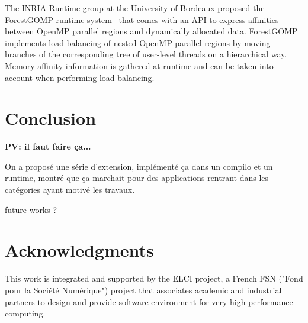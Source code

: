 \documentclass{Styles/llncs}
\newcommand{\PV}[1]{{\color{purple}\bfseries PV: #1}}
\begin{document}
The INRIA Runtime group at the University of Bordeaux proposed the
ForestGOMP runtime system~\cite{BroFurGogWacNam10IJPP} that comes
with an API to express affinities between OpenMP parallel regions and
dynamically allocated data. ForestGOMP implements load balancing of
nested OpenMP parallel regions by moving branches of the corresponding
tree of user-level threads on a hierarchical way. Memory affinity
information is gathered at runtime and can be taken into account when
performing load balancing.

\section{Conclusion}

\PV{il faut faire ça...}

On a proposé une série d'extension, implémenté ça dans un compilo et un runtime,
montré que ça marchait pour des applications rentrant dans les catégories ayant
motivé les travaux.

future works ?


\section*{Acknowledgments}


This work is integrated and supported by the ELCI  project, a French FSN ("Fond pour la Société Numérique")
project that associates academic and industrial partners to design and provide software environment for very high performance
computing.
  \small 

\end{document}
